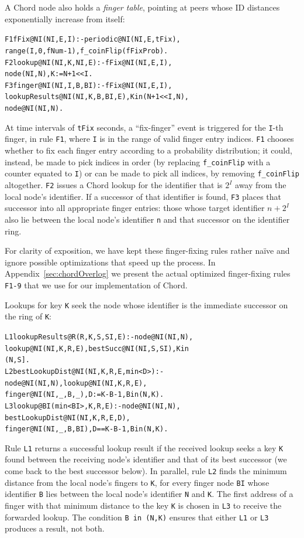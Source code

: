 \documentclass{sig-alt-full}
\newcommand{\ol}[1]{{\tt\footnotesize#1}}
\newenvironment{overlog}{\begin{alltt}\small}{\end{alltt}}
\begin{document}
A Chord node also holds a \emph{finger table}, pointing at peers whose
ID distances exponentially increase from itself:
\begin{overlog}
F1 fFix@NI(NI,E,I) :- periodic@NI(NI,E,tFix),
  range(I,0,fNum-1), f_coinFlip(fFixProb).
F2 lookup@NI(NI,K,NI,E) :- fFix@NI(NI,E,I),
  node(NI,N), K:=N+1<<I.
F3 finger@NI(NI,I,B,BI) :- fFix@NI(NI,E,I),
  lookupResults@NI(NI,K,B,BI,E), K in (N+1<<I,N),
  node@NI(NI,N).
\end{overlog}
At time intervals of \ol{tFix} seconds, a ``fix-finger'' event is
triggered for the \ol{I}-th finger, in rule \ol{F1}, where \ol{I} is in the range of
valid finger entry indices.  \ol{F1} chooses whether to fix each finger entry
according to a probability distribution; it could, instead, be made
to pick indices in order (by replacing \ol{f\_coinFlip} with a counter
equated to \ol{I}) or can be made to pick all indices, by removing \ol{f\_coinFlip} altogether.  \ol{F2} issues a Chord lookup for the
identifier that is $2^I$ away from the local node's identifier.  If a
successor of that identifier is found, \ol{F3} places that successor
into all appropriate finger entries: those whose target identifier $n +
2^I$ also lie between the local node's identifier \ol{n} and that
successor on the identifier ring.

For clarity of exposition, we have kept these
finger-fixing rules rather na\"{i}ve and ignore
possible optimizations that speed up the
process. In Appendix~\ref{sec:chordOverlog} we
present the actual optimized finger-fixing rules
\ol{F1-9} that we use for our implementation of
Chord.

Lookups for key \ol{K} seek the node whose identifier is the
immediate successor on the ring of \ol{K}:
\begin{overlog}
L1 lookupResults@R(R,K,S,SI,E) :- node@NI(NI,N),
  lookup@NI(NI,K,R,E), bestSucc@NI(NI,S,SI), K in
  (N,S].
L2 bestLookupDist@NI(NI,K,R,E,min<D>) :-
  node@NI(NI,N), lookup@NI(NI,K,R,E),
  finger@NI(NI,_,B,_), D:=K - B - 1, B in (N,K).
L3 lookup@BI(min<BI>,K,R,E) :- node@NI(NI,N),
  bestLookupDist@NI(NI,K,R,E,D),
  finger@NI(NI,_,B,BI), D == K - B - 1, B in (N,K).
\end{overlog}
Rule \ol{L1} returns a successful lookup result if the received
lookup seeks a key \ol{K} found
between the receiving node's identifier and that of its best successor
(we come back to the best successor below).  In parallel, rule \ol{L2} finds
the minimum distance from the local node's fingers to \ol{K}, for every
finger node \ol{BI} whose identifier \ol{B} lies
between the local node's identifier \ol{N} and \ol{K}.
The first address of a finger with that minimum
distance to the key \ol{K} is chosen in \ol{L3} to receive the
forwarded lookup. The condition \ol{B in (N,K)} ensures that either 
\ol{L1} or \ol{L3} produces a result, not both.
\end{document}
